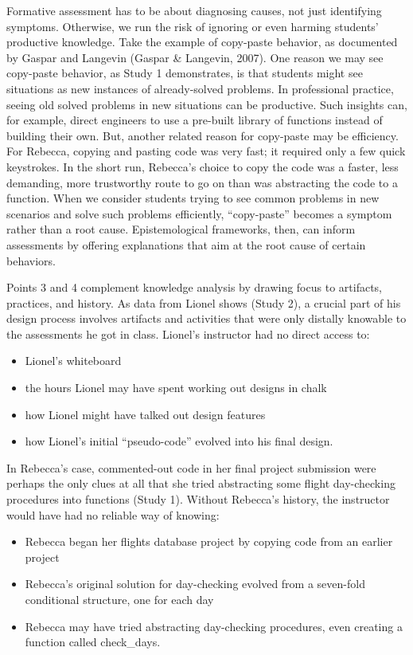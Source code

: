 Formative assessment has to be about diagnosing causes, not just identifying symptoms. Otherwise, we run the risk of ignoring or even harming students' productive knowledge. Take the example of copy-paste behavior, as documented by Gaspar and Langevin (Gaspar \& Langevin, 2007). One reason we may see copy-paste behavior, as Study 1 demonstrates, is that students might see situations as new instances of already-solved problems. In professional practice, seeing old solved problems in new situations can be productive. Such insights can, for example, direct engineers to use a pre-built library of functions instead of building their own. But, another related reason for copy-paste may be efficiency. For Rebecca, copying and pasting code was very fast; it required only a few quick keystrokes. In the short run, Rebecca's choice to copy the code was a faster, less demanding, more trustworthy route to go on than was abstracting the code to a function. When we consider students trying to see common problems in new scenarios and solve such problems efficiently, ``copy-paste'' becomes a symptom rather than a root cause. Epistemological frameworks, then, can inform assessments by offering explanations that aim at the root cause of certain behaviors.

Points 3 and 4 complement knowledge analysis by drawing focus to artifacts, practices, and history. As data from Lionel shows (Study 2), a crucial part of his design process involves artifacts and activities that were only distally knowable to the assessments he got in class. Lionel's instructor had no direct access to:

\begin{itemize}
\item
  Lionel's whiteboard
\item
  the hours Lionel may have spent working out designs in chalk
\item
  how Lionel might have talked out design features
\item
  how Lionel's initial ``pseudo-code'' evolved into his final design.
\end{itemize}

In Rebecca's case, commented-out code in her final project submission were perhaps the only clues at all that she tried abstracting some flight day-checking procedures into functions (Study 1). Without Rebecca's history, the instructor would have had no reliable way of knowing:

\begin{itemize}
\item
  Rebecca began her flights database project by copying code from an earlier project
\item
  Rebecca's original solution for day-checking evolved from a seven-fold conditional structure, one for each day
\item
  Rebecca may have tried abstracting day-checking procedures, even creating a function called check\_days.
\end{itemize}

